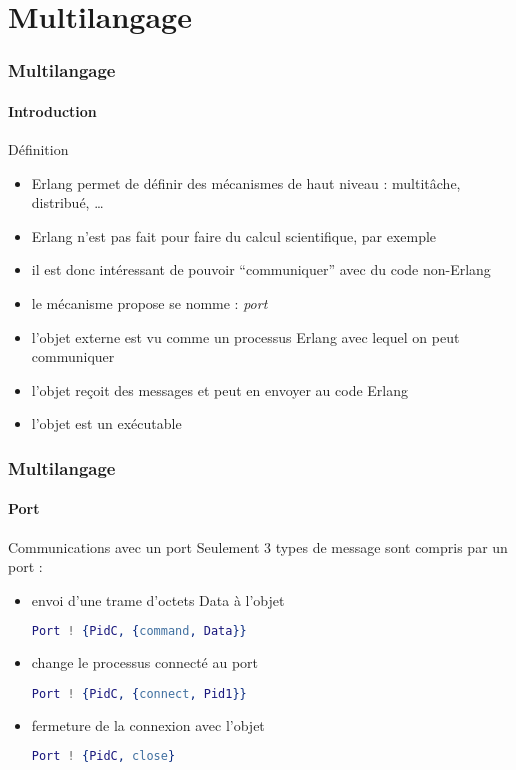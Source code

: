 \section{Multilangage}

\begin{frame}[fragile]
  \frametitle{Multilangage}
  \framesubtitle{Introduction}

  \begin{block}{Définition}
    \begin{itemize}
    \item Erlang permet de définir des mécanismes de haut niveau : multitâche,
      distribué, \ldots
    \item Erlang n'est pas fait pour faire du calcul scientifique, par exemple
    \item il est donc intéressant de pouvoir ``communiquer'' avec du code
      non-Erlang
    \item le mécanisme propose se nomme : \textit{port}
    \item l'objet externe est vu comme un processus Erlang avec lequel on
      peut communiquer
    \item l'objet reçoit des messages et peut en envoyer au code Erlang
    \item l'objet est un exécutable
    \end{itemize}
  \end{block}

\end{frame}

\begin{frame}[fragile]
  \frametitle{Multilangage}
  \framesubtitle{Port}

  \begin{exampleblock}{Communications avec un port}
    Seulement 3 types de message sont compris par un port :
    \begin{itemize}
    \item envoi d'une trame d'octets Data à l'objet
      \begin{lstlisting}[language=erlang]
Port ! {PidC, {command, Data}}
      \end{lstlisting}
    \item change le processus connecté au port
      \begin{lstlisting}[language=erlang]
Port ! {PidC, {connect, Pid1}}
      \end{lstlisting}
    \item fermeture de la connexion avec l'objet
      \begin{lstlisting}[language=erlang]
Port ! {PidC, close}
      \end{lstlisting}
    \end{itemize}
  \end{exampleblock}

\end{frame}

